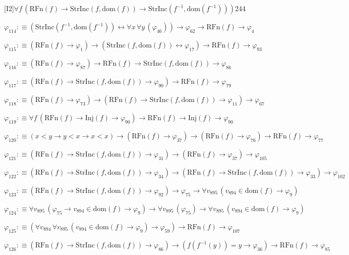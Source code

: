 \begin{fullproof}{[I2]}{$\forall f\,(\mathrm{RFn}(f) \to \mathrm{StrInc}(f,\mathrm{dom}(f)) \to \mathrm{StrInc}(f^{-1},\mathrm{dom}(f^{-1})))$}{244}
\begin{abbrevlist}
\item $\varphi_{114} :\equiv (\mathrm{StrInc}(f^{-1},\mathrm{dom}(f^{-1})) \leftrightarrow \forall x\,\forall y\,(\varphi_{46})) \to \varphi_{62} \to \mathrm{RFn}(f) \to \varphi_{4}$
\item $\varphi_{115} :\equiv (\mathrm{RFn}(f) \to \varphi_{1}) \to (\mathrm{StrInc}(f,\mathrm{dom}(f)) \leftrightarrow \varphi_{17}) \to \mathrm{RFn}(f) \to \varphi_{93}$
\item $\varphi_{116} :\equiv (\mathrm{RFn}(f) \to \varphi_{87}) \to \mathrm{RFn}(f) \to \mathrm{StrInc}(f,\mathrm{dom}(f)) \to \varphi_{86}$
\item $\varphi_{117} :\equiv (\mathrm{RFn}(f) \to \mathrm{StrInc}(f,\mathrm{dom}(f)) \to \varphi_{90}) \to \mathrm{RFn}(f) \to \varphi_{79}$
\item $\varphi_{118} :\equiv (\mathrm{RFn}(f) \to \varphi_{73}) \to (\mathrm{RFn}(f) \to \mathrm{StrInc}(f,\mathrm{dom}(f)) \to \varphi_{11}) \to \varphi_{67}$
\item $\varphi_{119} :\equiv \forall f\,(\mathrm{RFn}(f) \to \mathrm{Inj}(f) \to \varphi_{90}) \to \mathrm{RFn}(f) \to \mathrm{Inj}(f) \to \varphi_{90}$
\item $\varphi_{120} :\equiv (x < y \to y < x \to x < x) \to (\mathrm{RFn}(f) \to \varphi_{37}) \to (\mathrm{RFn}(f) \to \varphi_{76}) \to \mathrm{RFn}(f) \to \varphi_{77}$
\item $\varphi_{121} :\equiv (\mathrm{RFn}(f) \to \mathrm{StrInc}(f,\mathrm{dom}(f)) \to \varphi_{31}) \to (\mathrm{RFn}(f) \to \varphi_{37}) \to \varphi_{105}$
\item $\varphi_{122} :\equiv (\mathrm{RFn}(f) \to \mathrm{StrInc}(f,\mathrm{dom}(f)) \to \varphi_{34}) \to (\mathrm{RFn}(f) \to \mathrm{StrInc}(f,\mathrm{dom}(f)) \to \varphi_{33}) \to \varphi_{102}$
\item $\varphi_{123} :\equiv (\mathrm{RFn}(f) \to \mathrm{StrInc}(f,\mathrm{dom}(f)) \to \varphi_{92}) \to \varphi_{75} \to \forall v_{895}\,(v_{894} \in \mathrm{dom}(f) \to \varphi_{9})$
\item $\varphi_{124} :\equiv \forall v_{895}\,(\varphi_{75} \to v_{894} \in \mathrm{dom}(f) \to \varphi_{9}) \to \forall v_{895}\,(\varphi_{75}) \to \forall v_{895}\,(v_{894} \in \mathrm{dom}(f) \to \varphi_{9})$
\item $\varphi_{125} :\equiv (\forall v_{894}\,\forall v_{895}\,(v_{894} \in \mathrm{dom}(f) \to \varphi_{9}) \to \varphi_{59}) \to \mathrm{RFn}(f) \to \varphi_{107}$
\item $\varphi_{126} :\equiv (\mathrm{RFn}(f) \to \mathrm{StrInc}(f,\mathrm{dom}(f)) \to \varphi_{86}) \to (f(f^{-1}(y)) = y \to \varphi_{36}) \to \mathrm{RFn}(f) \to \varphi_{85}$

\end{abbrevlist}
\end{fullproof}
